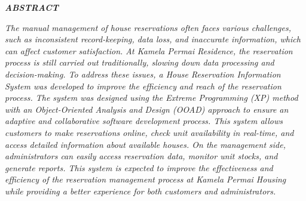 %


%
\fontsize{12}{14.4}
\begin{center}\MakeUppercase{\textbf{\emph{Abstract}}}\end{center}

\noindent
\fontsize{10pt}{12pt}\selectfont
\emph{The manual management of house reservations often faces various challenges, such as inconsistent record-keeping, data loss, and inaccurate information, which can affect customer satisfaction. At Kamela Permai Residence, the reservation process is still carried out traditionally, slowing down data processing and decision-making. To address these issues, a House Reservation Information System was developed to improve the efficiency and reach of the reservation process. The system was designed using the Extreme Programming (XP) method with an Object-Oriented Analysis and Design (OOAD) approach to ensure an adaptive and collaborative software development process. This system allows customers to make reservations online, check unit availability in real-time, and access detailed information about available houses. On the management side, administrators can easily access reservation data, monitor unit stocks, and generate reports. This system is expected to improve the effectiveness and efficiency of the reservation management process at Kamela Permai Housing while providing a better experience for both customers and administrators.}\\
 \\